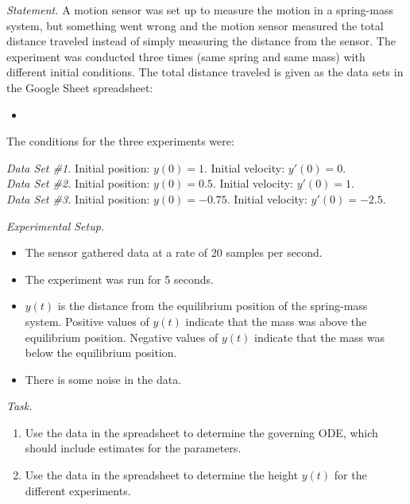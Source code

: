 \emph{Statement. } 
A motion sensor was set up to measure the motion in a spring-mass system, but something went wrong and the motion sensor measured the total distance traveled instead of simply measuring the distance from the sensor. The experiment was conducted three times (same spring and same mass) with different initial conditions. The total distance traveled is given as the data sets in the Google Sheet spreadsheet:
\begin{itemize}
	\item {}
\end{itemize}


The conditions for the three experiments were:

\emph{Data Set \#1.} Initial position: $y(0) = 1$. Initial velocity: $y'(0) = 0$.	 \\
\emph{Data Set \#2.} Initial position: $y(0) = 0.5$. Initial velocity: $y'(0) = 1$. \\	
\emph{Data Set \#3.} Initial position: $y(0) = -0.75$. Initial velocity: $y'(0) = -2.5$.	\\


\vfill

\emph{Experimental Setup.}

\begin{itemize}
	\item The sensor gathered data at a rate of 20 samples per second.
	\item The experiment was run for 5 seconds.
	\item $y(t)$ is the distance from the equilibrium position of the spring-mass system. Positive values of $y(t)$ indicate that the mass was above the equilibrium position. Negative values of $y(t)$ indicate that the mass was below the equilibrium position.
	\item There is some noise in the data.
\end{itemize}

\vfill

\emph{Task. } 

\begin{enumerate}[label=\emph{\arabic*.}]
	\item Use the data in the spreadsheet to determine the governing ODE, which should include estimates for the parameters.
	\item Use the data in the spreadsheet to determine the height $y(t)$ for the different experiments.
\end{enumerate}


